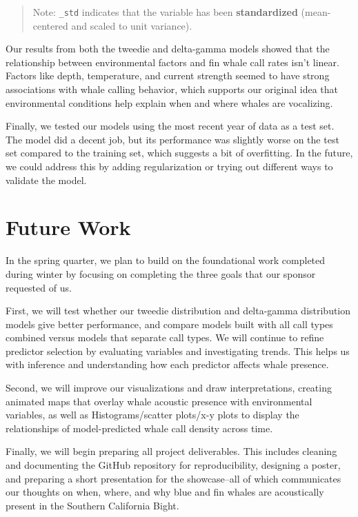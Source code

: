 \documentclass[
]{article}
\begin{document}
\begin{quote}
Note: \texttt{\_std} indicates that the variable has been
\textbf{standardized} (mean-centered and scaled to unit variance).
\end{quote}

Our results from both the tweedie and delta-gamma models showed that the
relationship between environmental factors and fin whale call rates
isn't linear. Factors like depth, temperature, and current strength
seemed to have strong associations with whale calling behavior, which
supports our original idea that environmental conditions help explain
when and where whales are vocalizing.

Finally, we tested our models using the most recent year of data as a
test set. The model did a decent job, but its performance was slightly
worse on the test set compared to the training set, which suggests a bit
of overfitting. In the future, we could address this by adding
regularization or trying out different ways to validate the model.

\section{Future Work}\label{future-work}

In the spring quarter, we plan to build on the foundational work
completed during winter by focusing on completing the three goals that
our sponsor requested of us.

First, we will test whether our tweedie distribution and delta-gamma
distribution models give better performance, and compare models built
with all call types combined versus models that separate call types. We
will continue to refine predictor selection by evaluating variables and
investigating trends. This helps us with inference and understanding how
each predictor affects whale presence.

Second, we will improve our visualizations and draw interpretations,
creating animated maps that overlay whale acoustic presence with
environmental variables, as well as Histograms/scatter plots/x-y plots
to display the relationships of model-predicted whale call density
across time.

Finally, we will begin preparing all project deliverables. This includes
cleaning and documenting the GitHub repository for reproducibility,
designing a poster, and preparing a short presentation for the
showcase--all of which communicates our thoughts on when, where, and why
blue and fin whales are acoustically present in the Southern California
Bight.
\end{document}
